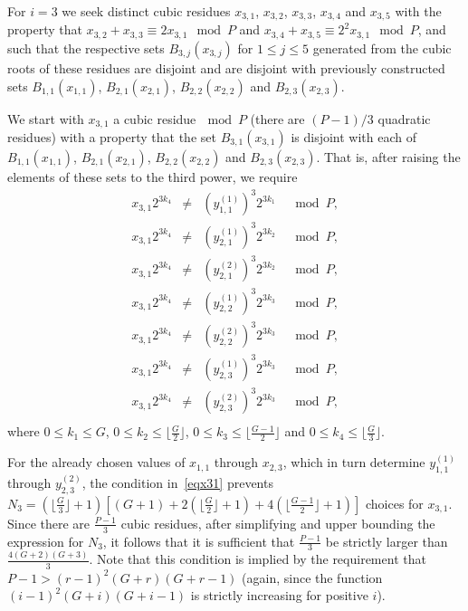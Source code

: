 \documentclass[12pt]{article} \pagestyle{plain} \topmargin
\begin{document}
For $i=3$ we seek distinct cubic residues $x_{3,1}$, $x_{3,2}$,
$x_{3,3}$, $x_{3,4}$ and $x_{3,5}$ with the property that
$x_{3,2}+ x_{3,3} \equiv 2x_{3,1} \mod P$ and $x_{3,4}+ x_{3,5}
\equiv 2^2x_{3,1} \mod P$, and such that the respective sets
$B_{3,j}(x_{3,j})$ for $1 \leq j \leq 5$ generated from the cubic
roots of these residues are disjoint and are disjoint with
previously constructed sets $B_{1,1}(x_{1,1})$,
$B_{2,1}(x_{2,1})$, $B_{2,2}(x_{2,2})$ and $B_{2,3}(x_{2,3})$.


We start with $x_{3,1}$ a cubic residue$~\mod P$ (there are
$(P-1)/3$ quadratic residues) with a property that the set
$B_{3,1}(x_{3,1})$ is disjoint with each of $B_{1,1}(x_{1,1})$,
$B_{2,1}(x_{2,1})$, $B_{2,2}(x_{2,2})$ and $B_{2,3}(x_{2,3})$.
That is, after raising the elements of these sets to the third
power, we require
\begin{equation}\label{eqx31}\begin{array}{cccc}
x_{3,1}2^{3k_4} &\neq& (y_{1,1}^{(1)})^3 2^{3k_1} &\mod P, \\
x_{3,1}2^{3k_4} &\neq& (y_{2,1}^{(1)})^3 2^{3k_2} &\mod P, \\
x_{3,1}2^{3k_4} &\neq& (y_{2,1}^{(2)})^3 2^{3k_2} &\mod P, \\
x_{3,1}2^{3k_4} &\neq& (y_{2,2}^{(1)})^3 2^{3k_3} &\mod P, \\
x_{3,1}2^{3k_4} &\neq& (y_{2,2}^{(2)})^3 2^{3k_3} &\mod P, \\
x_{3,1}2^{3k_4} &\neq& (y_{2,3}^{(1)})^3 2^{3k_3} &\mod P, \\
x_{3,1}2^{3k_4} &\neq& (y_{2,3}^{(2)})^3 2^{3k_3} &\mod P, \\
\end{array}\end{equation}
where $0 \leq k_1 \leq G$, $0 \leq k_2 \leq \lfloor \frac{G}{2}
\rfloor$, $0 \leq k_3 \leq \lfloor\frac{G-1}{2} \rfloor$ and $0
\leq k_4 \leq \lfloor\frac{G}{3} \rfloor$.

For the already chosen values of $x_{1,1}$ through $x_{2,3}$, which
in turn determine $y_{1,1}^{(1)}$ through $y_{2,3}^{(2)}$, the
condition in~\eqref{eqx31} prevents $N_3= \left(\lfloor \frac{G}{3}
\rfloor +1 \right)\left[ (G+1)+2\left(\lfloor \frac{G}{2} \rfloor +1
\right) +4\left(\lfloor \frac{G-1}{2} \rfloor +1 \right)\right]$
choices for $x_{3,1}$. Since there are $\frac{P-1}{3}$ cubic
residues, after simplifying and upper bounding the expression for
$N_3$, it follows that it is sufficient that $\frac{P-1}{3}$ be
strictly larger than $\frac{4(G+2)(G+3)}{3}$. Note that this
condition is implied by the requirement that $P-1>
(r-1)^2(G+r)(G+r-1)$ (again, since the function
$(i-1)^2(G+i)(G+i-1)$ is strictly increasing for positive $i$).
\end{document}
